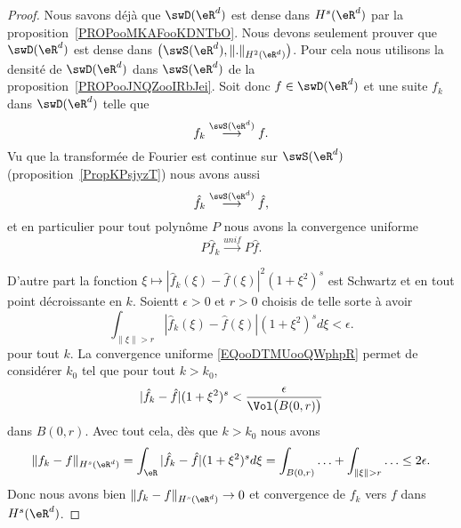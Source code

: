 \begin{proof}
	Nous savons déjà que \( \swD(\eR^d)\) est dense dans \( H^s(\eR^d)\) par la proposition~\ref{PROPooMKAFooKDNTbO}. Nous devons seulement prouver que \( \swD(\eR^d)\) est dense dans \( \big( \swS(\eR^d),\| . \|_{H^2(\eR^d)} \big)\). Pour cela nous utilisons la densité de \( \swD(\eR^d)\) dans \( \swS(\eR^d)\) de la proposition~\ref{PROPooJNQZooIRbJei}. Soit donc \( f\in\swD(\eR^d)\) et une suite \( f_k\) dans \( \swD(\eR^d)\) telle que
	\begin{equation}
		f_k\stackrel{\swS(\eR^d)}{\longrightarrow}f.
	\end{equation}
	Vu que la transformée de Fourier est continue sur \( \swS(\eR^d)\) (proposition~\ref{PropKPsjyzT}) nous avons aussi
	\begin{equation}
		\hat f_k\stackrel{\swS(\eR^d)}{\longrightarrow}\hat f,
	\end{equation}
	et en particulier pour tout polynôme \( P\) nous avons la convergence uniforme
	\begin{equation}        \label{EQooDTMUooQWphpR}
		P\hat f_k\stackrel{unif}{\longrightarrow}P\hat f.
	\end{equation}

	D'autre part la fonction \( \xi\mapsto | \hat f_k(\xi)-\hat f(\xi) |^2(1+\xi^2)^s\) est Schwartz et en tout point décroissante en \( k\). Soientt \( \epsilon>0\) et \( r>0\) choisis de telle sorte à avoir
	\begin{equation}
		\int_{\| \xi \|>r}| \hat f_{k}(\xi)-\hat f(\xi) |(1+\xi^2)^sd\xi<\epsilon.
	\end{equation}
	pour tout \( k\). La convergence uniforme \eqref{EQooDTMUooQWphpR} permet de considérer \( k_0\) tel que  pour tout \( k>k_0\),
	\begin{equation}
		| \hat f_k-\hat f |(1+\xi^2)^s< \frac{ \epsilon }{ \Vol\big( B(0,r) \big) }
	\end{equation}
	dans \( B(0,r)\). Avec tout cela, dès que \( k>k_0\) nous avons
	\begin{equation}
		\| f_k-f \|_{H^s(\eR^d)}=\int_{\eR}| \hat f_k-\hat f |(1+\xi^2)^sd\xi=\int_{B(0,r)}\ldots +\int_{\| \xi \|>r}\ldots\leq 2\epsilon.
	\end{equation}
	Donc nous avons bien \( \| f_k-f \|_{H^s(\eR^d)}\to 0\) et convergence de \( f_k\) vers \( f\) dans \( H^s(\eR^d)\).
\end{proof}

